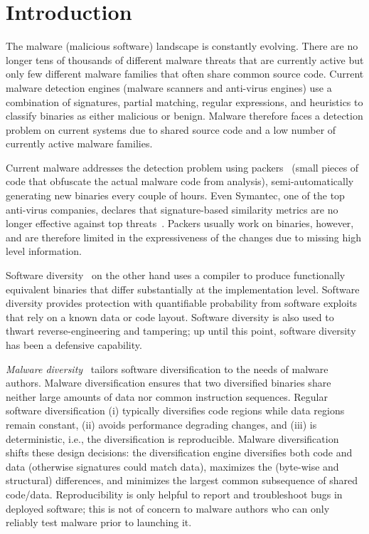 \documentclass[letterpaper,twocolumn,10pt]{article}
\begin{document}
\section{Introduction}

The malware (malicious software) landscape is constantly evolving.  There are no
longer tens of thousands of different malware threats that are currently active
but only few different malware families that often share common
source code. Current malware detection engines (malware scanners and anti-virus
engines) use a combination of signatures, partial matching, regular expressions,
and heuristics to classify binaries as either malicious or benign. Malware
therefore faces a detection problem on current systems due to shared source code
and a low number of currently active malware families. 

Current malware addresses the detection problem using packers~\cite{aspack,
themida} (small pieces of code that obfuscate the actual malware code from
analysis), semi-automatically generating new binaries every couple of hours.
Even Symantec, one of the top anti-virus companies, declares that signature-based
similarity metrics are no longer effective against top
threats~\cite{symantec14av}.  Packers usually work on binaries, however, and are therefore
limited in the expressiveness of the changes due to missing high level
information.

Software diversity~\cite{cohen93csec, collberg97, forrest97hotos, cox06usenix,
kisserli07cobassa, Lin09DIMVA, franz10npsw, multicompiler, Hiser12SP,
Pappas12SP, Giuffrida12SEC} on the other hand uses a compiler to produce 
functionally equivalent binaries that differ substantially at the
implementation level. Software diversity provides protection with quantifiable 
probability from software exploits that rely on a known data or code layout.
Software diversity is also used to thwart reverse-engineering and tampering; 
up until this point, software diversity has been a defensive capability.

\emph{Malware diversity}~\cite{payer14syscan} tailors software diversification
to the needs of malware authors. Malware diversification ensures that two
diversified binaries share neither large amounts of data nor common instruction
sequences. Regular software diversification (i) typically diversifies code
regions while data regions remain constant, (ii) avoids performance degrading
changes, and (iii) is deterministic, i.e., the diversification is reproducible.
Malware diversification shifts these design decisions: the diversification
engine diversifies both code and data (otherwise signatures could match data),
maximizes the (byte-wise and structural) differences, and minimizes the
largest common subsequence of shared code/data.  Reproducibility is only helpful
to report and troubleshoot bugs in deployed software; this is not of concern to
malware authors who can only reliably test malware prior to launching it.
\end{document}
